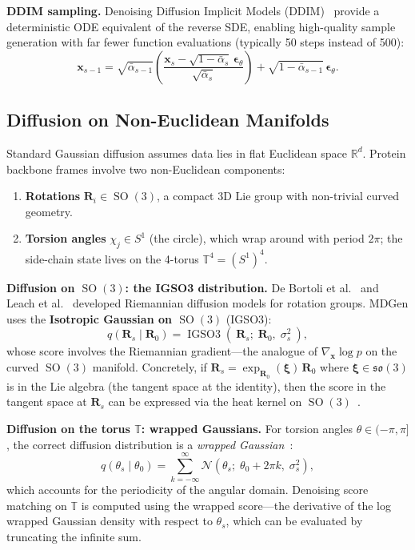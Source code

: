 \documentclass[11pt,a4paper]{article}
\DeclareMathOperator{\SO}{SO}
\DeclareMathOperator{\IGSO}{IGSO3}
\newcommand{\bx}{\mathbf{x}}
\newcommand{\bR}{\mathbf{R}}
\newcommand{\beps}{\boldsymbol{\epsilon}}
\newcommand{\RR}{\mathbb{R}}
\newcommand{\TT}{\mathbb{T}}
\begin{document}
\textbf{DDIM sampling.}  Denoising Diffusion Implicit Models (DDIM)~\cite{song2021ddim} provide a
deterministic ODE equivalent of the reverse SDE, enabling high-quality sample generation with far
fewer function evaluations (typically 50 steps instead of 500):
\begin{equation}
  \bx_{s-1} = \sqrt{\bar\alpha_{s-1}}\!\left(\frac{\bx_s - \sqrt{1-\bar\alpha_s}\,\beps_\theta}
  {\sqrt{\bar\alpha_s}}\right) + \sqrt{1-\bar\alpha_{s-1}}\,\beps_\theta.
  \label{eq:ddim}
\end{equation}

\subsection{Diffusion on Non-Euclidean Manifolds}

Standard Gaussian diffusion assumes data lies in flat Euclidean space $\RR^d$.  Protein backbone
frames involve two non-Euclidean components:
\begin{enumerate}[leftmargin=2em]
  \item \textbf{Rotations} $\bR_i \in \SO(3)$, a compact 3D Lie group with non-trivial curved
    geometry.
  \item \textbf{Torsion angles} $\chi_j \in S^1$ (the circle), which wrap around with period
    $2\pi$; the side-chain state lives on the 4-torus $\TT^4 = (S^1)^4$.
\end{enumerate}

\textbf{Diffusion on $\SO(3)$: the IGSO3 distribution.}  De Bortoli et al.~\cite{debortoli2022}
and Leach et al.~\cite{leach2022} developed Riemannian diffusion models for rotation groups.
MDGen uses the \textbf{Isotropic Gaussian on $\SO(3)$} (IGSO3):
\begin{equation}
  q(\bR_s \mid \bR_0) = \IGSO(\ \bR_s;\; \bR_0,\; \sigma_s^2\ ),
  \label{eq:igso3}
\end{equation}
whose score involves the Riemannian gradient---the analogue of $\nabla_\bx \log p$ on the curved
$\SO(3)$ manifold.  Concretely, if $\bR_s = \exp_{\bR_0}(\bm\xi)\,\bR_0$ where $\bm\xi \in
\mathfrak{so}(3)$ is in the Lie algebra (the tangent space at the identity), then the score in the
tangent space at $\bR_s$ can be expressed via the heat kernel on $\SO(3)$~\cite{debortoli2022}.

\textbf{Diffusion on the torus $\TT$: wrapped Gaussians.}  For torsion angles $\theta \in
(-\pi, \pi]$, the correct diffusion distribution is a \emph{wrapped Gaussian}~\cite{jing2022torsional}:
\begin{equation}
  q(\theta_s \mid \theta_0) = \sum_{k=-\infty}^{\infty} \mathcal{N}(\theta_s;\;
  \theta_0 + 2\pi k,\; \sigma_s^2),
  \label{eq:wrapped_gaussian}
\end{equation}
which accounts for the periodicity of the angular domain.  Denoising score matching on $\TT$ is
computed using the wrapped score---the derivative of the log wrapped Gaussian density with respect
to $\theta_s$, which can be evaluated by truncating the infinite sum.
\end{document}
